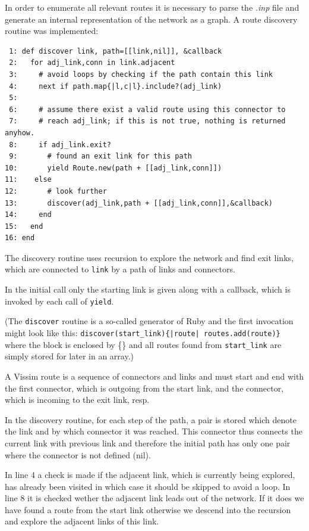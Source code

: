 In order to enumerate all relevant routes it is necessary to parse the \textit{.inp} file and generate an internal representation of the network as a graph. A route discovery routine was implemented:

\begin{verbatim}
 1: def discover link, path=[[link,nil]], &callback
 2:   for adj_link,conn in link.adjacent
 3:     # avoid loops by checking if the path contain this link
 4:     next if path.map{|l,c|l}.include?(adj_link) 
 5:     
 6:     # assume there exist a valid route using this connector to 
 7:     # reach adj_link; if this is not true, nothing is returned anyhow.
 8:     if adj_link.exit?
 9:       # found an exit link for this path
10:       yield Route.new(path + [[adj_link,conn]]) 
11:    else
12:       # look further
13:       discover(adj_link,path + [[adj_link,conn]],&callback)
14:     end
15:   end
16: end
\end{verbatim}

The discovery routine uses recursion to explore the network and find exit links, which are connected to \verb|link| by a path of links and connectors.

In the initial call only the starting link is given along with a callback, which is invoked by each call of \verb|yield|. 

(The \verb|discover| routine is a so-called generator of Ruby and the first invocation might look like this: \verb+discover(start_link){|route| routes.add(route)}+ where the block is enclosed by \{\} and all routes found from \verb|start_link| are simply stored for later in an array.)

A Vissim route is a sequence of connectors and links and must start and end with the first connector, which is outgoing from the start link, and the connector, which is incoming to the exit link, resp.

In the discovery routine, for each step of the path, a pair is stored which denote the link and by which connector it was reached. This connector thus connects the current link with previous link and therefore the initial path has only one pair where the connector is not defined (nil).

In line 4 a check is made if the adjacent link, which is currently being explored, has already been visited in which case it should be skipped to avoid a loop. In line 8 it is checked wether the adjacent link leads out of the network. If it does we have found a route from the start link otherwise we descend into the recursion and explore the adjacent links of this link.

